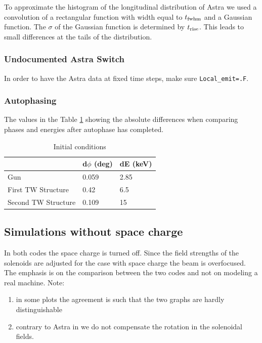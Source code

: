 \documentclass{psi-note}    %
\begin{document}
To approximate the histogram of the longitudinal distribution of Astra we used a convolution of a rectangular function with width equal to $t_{\rm fwhm}$ and a Gaussian function. The $\sigma$ of the Gaussian function is determined by $t_{\rm rise}$\footnotemark[1]. This leads to small differences at the tails of the distribution.

\subsubsection{Undocumented Astra Switch}

In order to have the Astra data at fixed time steps, make sure {\tt Local\_emit=.F}.

\subsubsection{Autophasing}
The values in the Table \ref{tab:aph} showing the absolute differences when comparing phases and energies 
after autophase has completed. 
\begin{table}[h]\footnotesize
{\renewcommand{\arraystretch}{1.5}
\renewcommand{\tabcolsep}{0.5cm}}
\caption{Initial conditions}
\centering
  \label{tab:aph}
  \begin{tabular}{ l  l   l  }
    \hline
    
    &  d$\phi$ (deg) & dE (keV)  \\
    \hline
    Gun  &  0.059  & 2.85 \\
    First TW Structure  &  0.42 & 6.5 \\
    Second TW Structure & 0.109 & 15 \\

      \hline 
 \hline
  \end{tabular}
 \end{table}


\subsection{Simulations without space charge}  \label{sec:OPALAstra-noSC}
In both codes the space charge is turned off. 
Since the field strengths of the solenoids are adjusted for the case with space charge the beam is overfocused. The emphasis is on the comparison between the two codes and not on modeling a real machine.
Note:
\begin{enumerate}
\item in some plots the agreement is such that the two graphs are hardly distinguishable
\item contrary to Astra in \opalt we do not compensate the rotation in the solenoidal fields.
\end{enumerate}
\end{document}
